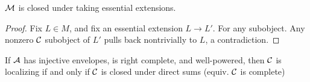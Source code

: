 \begin{por}
$\mathcal{M}$ is closed under taking essential extensions.
\end{por}
\begin{proof}
Fix $L \in M$, and fix an essential extension $L \to L'$. For any 
subobject. Any nonzero $\mathcal{C}$ subobject of $L'$ pulls back 
nontrivially to $L$, a contradiction.
\end{proof}

\begin{cor}
If $\mathcal{A}$ has injective envelopes, is right complete, and
well-powered, then $\mathcal{C}$ is localizing if and only if $\mathcal{C}$
is closed under direct sums (equiv. $\mathcal{C}$ is complete)
\end{cor}

